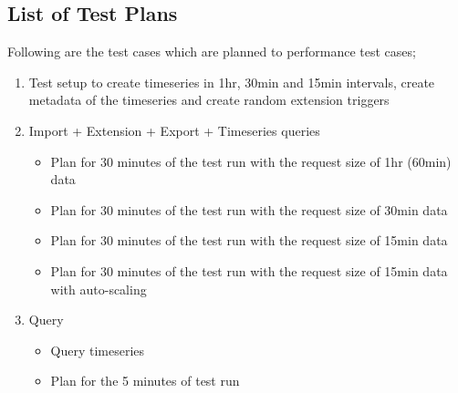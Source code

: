 \subsection{List of Test Plans}
\label{subse:test_plan_flow}
Following are the test cases which are planned to performance test cases;
\begin{enumerate}
    \item Test setup to create timeseries in 1hr, 30min and 15min intervals, create metadata of the timeseries and create random extension triggers
    \item Import + Extension + Export + Timeseries queries
    \begin{itemize}
        \item Plan for 30 minutes of the test run with the request size of 1hr (60min) data
        \item Plan for 30 minutes of the test run with the request size of 30min data
        \item Plan for 30 minutes of the test run with the request size of 15min data
        \item Plan for 30 minutes of the test run with the request size of 15min data with auto-scaling
    \end{itemize}
    \item Query
    \begin{itemize}
        \item Query timeseries
        \item Plan for the 5 minutes of test run
    \end{itemize}
\end{enumerate}


